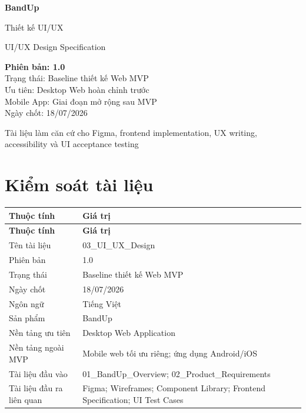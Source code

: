 \documentclass[11pt,a4paper]{article}
\begin{document}
\begin{titlepage}
\centering
\vspace*{2.5cm}
{\sffamily\fontsize{34}{40}\selectfont\bfseries\color{BandBlue} BandUp\par}
\vspace{0.55cm}
{\sffamily\fontsize{22}{28}\selectfont Thiết kế UI/UX\par}
\vspace{0.25cm}
{\sffamily\large UI/UX Design Specification\par}
\vfill
\begin{tcolorbox}[colback=BandLight,colframe=BandBlue,width=0.80\textwidth,boxrule=0.7pt,arc=2mm]
\centering\sffamily
\textbf{Phiên bản: 1.0}\\[1mm]
Trạng thái: Baseline thiết kế Web MVP\\[1mm]
Ưu tiên: Desktop Web hoàn chỉnh trước\\[1mm]
Mobile App: Giai đoạn mở rộng sau MVP\\[1mm]
Ngày chốt: 18/07/2026
\end{tcolorbox}
\vspace{1.2cm}
{\sffamily\small Tài liệu làm căn cứ cho Figma, frontend implementation, UX writing, accessibility và UI acceptance testing\par}
\vspace*{1cm}
\end{titlepage}

\section*{Kiểm soát tài liệu}
\small
\setlength{\tabcolsep}{4pt}
\renewcommand{\arraystretch}{1.18}
\begin{longtable}{|P{0.28\textwidth}|P{0.64\textwidth}|}
\hline
\textbf{Thuộc tính} & \textbf{Giá trị} \\ \hline
\endfirsthead
\hline
\textbf{Thuộc tính} & \textbf{Giá trị} \\ \hline
\endhead
Tên tài liệu & 03\_UI\_UX\_Design \\ \hline
Phiên bản & 1.0 \\ \hline
Trạng thái & Baseline thiết kế Web MVP \\ \hline
Ngày chốt & 18/07/2026 \\ \hline
Ngôn ngữ & Tiếng Việt \\ \hline
Sản phẩm & BandUp \\ \hline
Nền tảng ưu tiên & Desktop Web Application \\ \hline
Nền tảng ngoài MVP & Mobile web tối ưu riêng; ứng dụng Android/iOS \\ \hline
Tài liệu đầu vào & 01\_BandUp\_Overview; 02\_Product\_Requirements \\ \hline
Tài liệu đầu ra liên quan & Figma; Wireframes; Component Library; Frontend Specification; UI Test Cases \\ \hline
\end{longtable}
\normalsize
\end{document}
